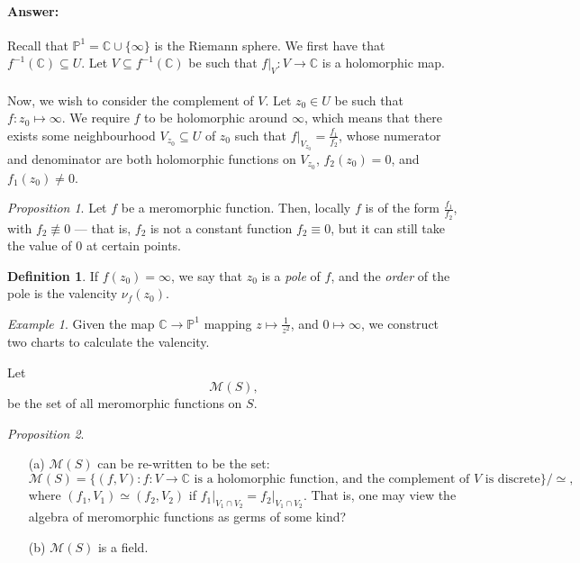 \documentclass[a4paper]{report}
\theoremstyle{definition}
\newtheorem{definition}{Definition}
\theoremstyle{remark}
\theoremstyle{proposition}
\newtheorem{proposition}{Proposition}
\theoremstyle{conjecture}
\theoremstyle{lemma}
\theoremstyle{corollary}
\theoremstyle{exercise}
\theoremstyle{example}
\newtheorem{example}{Example}
\newcommand{\C}{\mathbb{C}}
\newcommand{\mcal}{\mathcal}
\begin{document}
\paragraph{Answer:} Recall that $\mathbb{P}^1 = \C \cup \lbrace \infty\rbrace$ is the Riemann
sphere. We first have that $f^{-1}(\C) \subseteq U$. 
Let $V \subseteq f^{-1}(\C)$ be such that $f\vert_V : V \to \C$ 
is a holomorphic map. \\\\
Now, we wish to consider the complement of $V$. Let $z_0 \in U$ be such that 
$f : z_0 \mapsto \infty$. We require $f$ to be holomorphic around $\infty$, 
which means that there exists some neighbourhood $V_{z_0} \subseteq U$ of $z_0$ 
such that $f\vert_{V_{z_0}} = \frac{f_1}{f_2}$, whose numerator and denominator
are both holomorphic functions on $V_{z_0}$, $f_2(z_0) = 0$, and $f_1(z_0)\neq0$.

\begin{proposition}
    Let $f$ be a meromorphic function. Then, locally $f$ is of the form 
    $\frac{f_1}{f_2}$, with $f_2 \not\equiv 0$ --- that is, $f_2$ is not a 
    constant function $f_2 \equiv 0$, but it can still take the value of $0$
    at certain points.
\end{proposition}


\begin{definition}
    If $f(z_0) = \infty$, we say that $z_0$ is a \emph{pole} of $f$, and the 
    \emph{order} of the pole is the valencity $\nu_f(z_0)$. 
\end{definition}

\begin{example}
    Given the map $\C \to \mathbb{P}^1$ mapping $z\mapsto \frac{1}{z^2}$, 
    and $0\mapsto \infty$, we construct two charts to calculate the valencity.
\end{example}

Let $$\mcal{M}(S),$$ be the set of all meromorphic functions on $S$.

\begin{proposition}
    \begin{itemize}
        \item[(a)]
            $\mcal{M}(S)$ can be re-written to be the set:
            $$\mcal{M}(S) = \lbrace (f,V) : \text{$f : V \to \C$ is a holomorphic function, and the complement of $V$ is discrete}\rbrace/\simeq,$$
            where $(f_1,V_1) \simeq (f_2,V_2)$ if $f_1\vert_{V_1\cap V_2} = f_2\vert_{V_1\cap V_2}$.
        That is, one may view the algebra of meromorphic functions as germs of some kind?
        \item[(b)] $\mcal{M}(S)$ is a field.
    \end{itemize}
\end{proposition}
\end{document}
